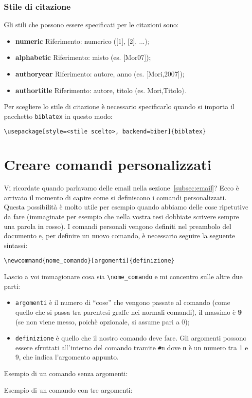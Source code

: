 \subsection{Stile di citazione}
Gli stili che possono essere specificati per le citazioni sono:
\begin{itemize}
    \item \textbf{numeric} Riferimento: numerico ([1], [2], ...);
    \item \textbf{alphabetic} Riferimento: misto (es. [Mor07]);
    \item \textbf{authoryear} Riferimento: autore, anno (es. [Mori,2007]);
    \item \textbf{authortitle} Riferimento: autore, titolo (es. Mori,Titolo).
\end{itemize}
Per scegliere lo stile di citazione è necessario specificarlo quando si importa
il pacchetto \verb!biblatex! in questo modo:
\begin{lstlisting}
\usepackage[style=<stile scelto>, backend=biber]{biblatex}
\end{lstlisting}

\chapter{Creare comandi personalizzati}
Vi ricordate quando parlavamo delle email nella sezione~\ref{subsec:email}? 
Ecco è arrivato il momento di capire come si definiscono i comandi 
personalizzati. Questa possibilità è molto utile per esempio quando abbiamo 
delle cose ripetutive da fare (immaginate per esempio che nella vostra tesi 
dobbiate scrivere sempre una parola in rosso). I comandi personali vengono 
definiti nel preambolo del documento e, per definire un nuovo comando, è 
necessario seguire la seguente sintassi: \\
\begin{center}
    \verb!\newcommand{nome_comando}[argomenti]{definizione}!
\end{center}
Lascio a voi immagionare cosa sia \verb!\nome_comando! e mi concentro sulle 
altre due parti:
\begin{itemize}
    \item \verb!argomenti! è il numero di ``cose'' che vengono passate al 
    comando (come quello che si passa tra parentesi graffe nei normali 
    comandi), il massimo è \textbf{9} (se non viene messo, poichè opzionale, 
    si assume pari a 0);
    \item \verb!definizione! è quello che il nostro comando deve fare. Gli 
    argomenti possono essere sfruttati all'interno del comando tramite 
    \verb!#n! dove \verb!n! è un numero tra 1 e 9, che indica l'argomento 
    appunto.
\end{itemize}

Esempio di un comando senza argomenti:


Esempio di un comando con tre argomenti:
